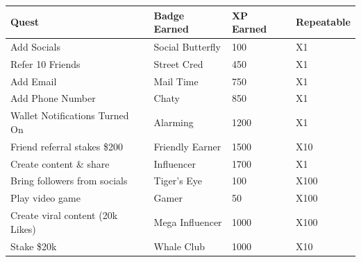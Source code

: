 \documentclass[11pt]{article}
\begin{document}
\begin{table}[htbp]
\centering
\begin{tabular}{l|l|l|l}
\toprule
Quest & Badge Earned & XP Earned & Repeatable \\
\midrule
Add Socials & Social Butterfly & 100 & X1 \\
Refer 10 Friends & Street Cred & 450 & X1 \\
Add Email & Mail Time & 750 & X1 \\
Add Phone Number & Chaty & 850 & X1 \\
Wallet Notifications Turned On & Alarming & 1200 & X1 \\
Friend referral stakes \$200 & Friendly Earner & 1500 & X10 \\
Create content \& share & Influencer & 1700 & X1 \\
Bring followers from socials & Tiger's Eye & 100 & X100 \\
Play video game & Gamer & 50 & X100 \\
Create viral content (20k Likes) & Mega Influencer & 1000 & X100 \\
Stake \$20k & Whale Club & 1000 & X10 \\
\bottomrule
\end{tabular}
\end{table}
\end{document}
